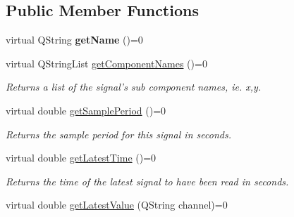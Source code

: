 \subsection*{Public Member Functions}
\begin{DoxyCompactItemize}
\item 
\hypertarget{class_picto_1_1_signal_reader_aa88bbe0e096b680eeaae8b94b4e5b018}{virtual Q\-String {\bfseries get\-Name} ()=0}\label{class_picto_1_1_signal_reader_aa88bbe0e096b680eeaae8b94b4e5b018}

\item 
\hypertarget{class_picto_1_1_signal_reader_a92cb9e1d61e57d99c3b1d66e8ce64d98}{virtual Q\-String\-List \hyperlink{class_picto_1_1_signal_reader_a92cb9e1d61e57d99c3b1d66e8ce64d98}{get\-Component\-Names} ()=0}\label{class_picto_1_1_signal_reader_a92cb9e1d61e57d99c3b1d66e8ce64d98}

\begin{DoxyCompactList}\small\item\em Returns a list of the signal's sub component names, ie. x,y. \end{DoxyCompactList}\item 
\hypertarget{class_picto_1_1_signal_reader_aaffe6644b67ca9e0a49041b5b6bd5989}{virtual double \hyperlink{class_picto_1_1_signal_reader_aaffe6644b67ca9e0a49041b5b6bd5989}{get\-Sample\-Period} ()=0}\label{class_picto_1_1_signal_reader_aaffe6644b67ca9e0a49041b5b6bd5989}

\begin{DoxyCompactList}\small\item\em Returns the sample period for this signal in seconds. \end{DoxyCompactList}\item 
\hypertarget{class_picto_1_1_signal_reader_a88f925f09c3ab3d524e4aab6b1141f01}{virtual double \hyperlink{class_picto_1_1_signal_reader_a88f925f09c3ab3d524e4aab6b1141f01}{get\-Latest\-Time} ()=0}\label{class_picto_1_1_signal_reader_a88f925f09c3ab3d524e4aab6b1141f01}

\begin{DoxyCompactList}\small\item\em Returns the time of the latest signal to have been read in seconds. \end{DoxyCompactList}\item 
\hypertarget{class_picto_1_1_signal_reader_a2a02ba88514a1870f1553701e133cd52}{virtual double \hyperlink{class_picto_1_1_signal_reader_a2a02ba88514a1870f1553701e133cd52}{get\-Latest\-Value} (Q\-String channel)=0}\label{class_picto_1_1_signal_reader_a2a02ba88514a1870f1553701e133cd52}


\end{DoxyCompactItemize}
